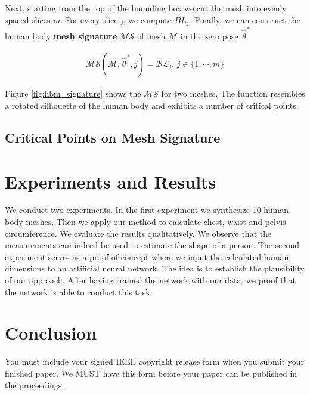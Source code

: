 \documentclass[10pt,twocolumn,letterpaper]{article}
\begin{document}
Next, starting from the top of the bounding box we cut the mesh into evenly 
spaced slices $m$. For every slice j, we compute $BL_j$. Finally, we can 
construct the human body \textbf{mesh signature} $\mathcal{MS}$ of mesh 
$\mathcal{M}$ in the zero pose $\vec{\theta}^*$

\begin{align}
\mathcal{MS}(\mathcal{M}, \vec{\theta}^*, j) = \mathcal{BL}_j, \, j \in \{1, 
\cdots, m\}
\end{align}

Figure \ref{fig:hbm_signature} shows the $\mathcal{MS}$ for two meshes. The 
function resembles a rotated silhouette of the human body and exhibits a number 
of critical points. 



\subsection{Critical Points on Mesh Signature}

 

\section{Experiments and Results}

We conduct two experiments. In the first experiment we synthesize 10 human body 
meshes. Then we apply our method to calculate chest, waist and pelvis 
circumference. We evaluate the results qualitatively. We observe that the 
measurements can indeed be used to estimate the shape of a person. The second 
experiment serves as a proof-of-concept where we input the calculated human 
dimensions to an artificial neural network. The idea is to establish the 
plausibility of our approach. After having trained the network with our data, 
we proof that the network is able to conduct this task.


\section{Conclusion}

You must include your signed IEEE copyright release form when you submit
your finished paper. We MUST have this form before your paper can be
published in the proceedings.

{\small


}
\end{document}
